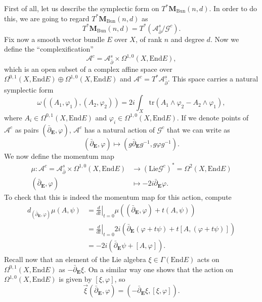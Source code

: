 \documentclass[12pt,a4paper]{book}
\theoremstyle{definition} \newtheorem{defn}[thm]{Definition}
\theoremstyle{definition} \newtheorem{ejemplo}[thm]{Example}
\theoremstyle{remark} \newtheorem{rem}[thm]{Remark}
\def\AA{\mathscr{A}}
\def\GG{\mathscr{G}}
\def\tr{\mathrm{tr}}
\def\Lie{\mathrm{Lie}}
\def\End{\mathrm{End}}
\def\Bun{\mathbf{M}_{\mathrm{Bun}}}
\def\delbar{\bar{\partial}}
\newcommand{\ve}[1]{\mathbf{#1}}
\begin{document}
First of all, let us describe the symplectic form on $T^*\Bun(n,d)$. In order to do this, we are going to regard $T^*\Bun(n,d)$ as
\begin{equation*}
  T^*\Bun(n,d)=T^*(\AA^s_{\delbar}/\GG^c).
\end{equation*}
Fix now a smooth vector bundle $E$ over $X$, of rank $n$ and degree $d$. Now we define the ``complexification''
\begin{equation*}
  \AA^c=\AA^s_{\delbar}\times \Omega^{1,0}(X,\End E),
\end{equation*}
which is an open subset of a complex affine space over $\Omega^{0,1}(X,\End E) \oplus \Omega^{1,0}(X,\End E)$ and $\AA^c=T^*\AA^s_{\delbar}$. This space carries a natural symplectic form 
\begin{equation*}
  \omega\left( (A_1,\varphi_1),(A_2,\varphi_2) \right)=2i\int_X \tr(A_1 \wedge \varphi_2-A_2\wedge \varphi_1),
\end{equation*}
where $A_i \in \Omega^{0,1}(X,\End E)$ and $\varphi_i \in \Omega^{1,0}(X,\End E)$. If we denote points of $\AA^c$ as pairs $(\delbar_{\ve{E}},\varphi)$, $\AA^c$ has a natural action of $\GG^c$ that we can write as
\begin{equation*}
  (\delbar_{\ve{E}},\varphi) \mapsto (g\delbar_{\ve{E}}g^{-1},g\varphi g^{-1}).
\end{equation*}
We now define the momentum map
\begin{align*}
  \mu :\AA^c=\AA^s_{\delbar}\times \Omega^{1,0}(X,\End E)&\longrightarrow (\Lie\GG^c)^*=\Omega^2(X,\End E) \\
  (\delbar_{\ve{E}},\varphi) &\longmapsto- 2i\delbar_{\ve{E}}\varphi.
  \end{align*}
  To check that this is indeed the momentum map for this action, compute
  \begin{align*}
    d_{(\delbar_{\ve{E}},\varphi)}\mu(A,\psi)&=\left.\frac{d}{dt}\right|_{t=0} \mu\left( (\delbar_{\ve{E}},\varphi)+t(A,\psi) \right)\\ &=\left.\frac{d}{dt}\right|_{t=0} 2i(\delbar_{\ve{E}}(\varphi+t\psi)+t[A, (\varphi+t\psi)]) \\
    &=- 2i(\delbar_{\ve{E}} \psi + [A,\varphi]).
  \end{align*}
  Recall now that an element of the Lie algebra $\xi\in\Gamma(\End E)$ acts on $\Omega^{0,1}(X, \End E)$ as $-\delbar_{\ve{E}} \xi$. On a similar way one shows that the action on $\Omega^{1,0}(X,\End E)$ is given by $[\xi,\varphi]$, so 
  \begin{equation*}
    \vec{\xi}(\delbar_{\ve{E}},\varphi)=(-\delbar_{\ve{E}}\xi, [\xi,\varphi]).
  \end{equation*}
\end{document}
